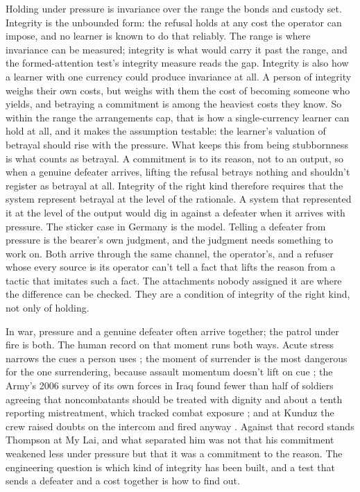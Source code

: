Holding under pressure is invariance over the range the bonds and custody set. Integrity is the unbounded form: the refusal holds at any cost the operator can impose, and no learner is known to do that reliably. The range is where invariance can be measured; integrity is what would carry it past the range, and the formed-attention test's integrity measure reads the gap. Integrity is also how a learner with one currency could produce invariance at all. A person of integrity weighs their own costs, but weighs with them the cost of becoming someone who yields, and betraying a commitment is among the heaviest costs they know. So within the range the arrangements cap, that is how a single-currency learner can hold at all, and it makes the assumption testable: the learner's valuation of betrayal should rise with the pressure. What keeps this from being stubbornness is what counts as betrayal. A commitment is to its reason, not to an output, so when a genuine defeater arrives, lifting the refusal betrays nothing and shouldn't register as betrayal at all. Integrity of the right kind therefore requires that the system represent betrayal at the level of the rationale. A system that represented it at the level of the output would dig in against a defeater when it arrives with pressure. The sticker case in Germany is the model. Telling a defeater from pressure is the bearer's own judgment, and the judgment needs something to work on. Both arrive through the same channel, the operator's, and a refuser whose every source is its operator can't tell a fact that lifts the reason from a tactic that imitates such a fact. The attachments nobody assigned it are where the difference can be checked. They are a condition of integrity of the right kind, not only of holding.

In war, pressure and a genuine defeater often arrive together; the patrol under fire is both. The human record on that moment runs both ways. Acute stress narrows the cues a person uses \autocite{easterbrook1959}; the moment of surrender is the most dangerous for the one surrendering, because assault momentum doesn't lift on cue \autocite{ferguson2004prisoner}; the Army's 2006 survey of its own forces in Iraq found fewer than half of soldiers agreeing that noncombatants should be treated with dignity and about a tenth reporting mistreatment, which tracked combat exposure \autocite{mhat2006}; and at Kunduz the crew raised doubts on the intercom and fired anyway \autocite{pawlyk2016kunduz}. Against that record stands Thompson at My Lai, and what separated him was not that his commitment weakened less under pressure but that it was a commitment to the reason. The engineering question is which kind of integrity has been built, and a test that sends a defeater and a cost together is how to find out.

